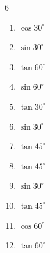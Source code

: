 \begin{multicols}{6}
\begin{enumerate}

  \item $\displaystyle \cos{30^\circ}$


  \item $\displaystyle \sin{30^\circ}$


  \item $\displaystyle \tan{60^\circ}$


  \item $\displaystyle \sin{60^\circ}$


  \item $\displaystyle \tan{30^\circ}$


  \item $\displaystyle \sin{30^\circ}$


  \item $\displaystyle \tan{45^\circ}$

        \phantom{$\displaystyle =1$}

\columnbreak %

  \item $\displaystyle \tan{45^\circ}$

        \phantom{$\displaystyle =1$}

  \item $\displaystyle \sin{30^\circ}$


  \item $\displaystyle \tan{45^\circ}$

        \phantom{$\displaystyle =1$}

  \item $\displaystyle \cos{60^\circ}$


  \item $\displaystyle \tan{60^\circ}$



\end{enumerate}
\end{multicols}
